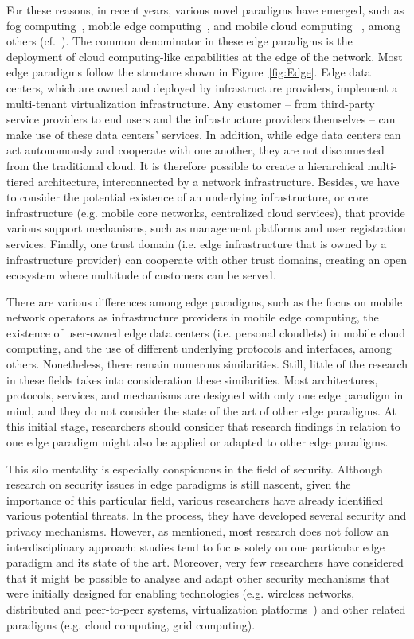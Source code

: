 \documentclass[twocolumn,preprint,3p]{elsarticle}
\begin{document}
For these reasons, in recent years, various novel paradigms have emerged, such as fog computing~\cite{Vaquero14}, mobile edge computing~\cite{Michael14}, and mobile cloud computing ~\cite{WangMCC15}, among others (cf.~\cite{Manco2015,GarciaLopez15}). The common denominator in these edge paradigms is the deployment of cloud computing-like capabilities at the edge of the network. Most edge paradigms follow the structure shown in Figure~\ref{fig:Edge}. Edge data centers, which are owned and deployed by infrastructure providers, implement a multi-tenant virtualization infrastructure. Any customer -- from third-party service providers to end users and the infrastructure providers themselves -- can make use of these data centers' services. In addition, while edge data centers can act autonomously and cooperate with one another, they are not disconnected from the traditional cloud. It is therefore possible to create a hierarchical multi-tiered architecture, interconnected by a network infrastructure. Besides, we have to consider the potential existence of an underlying infrastructure, or core infrastructure (e.g. mobile core networks, centralized cloud services), that provide various support mechanisms, such as management platforms and user registration services. Finally, one trust domain (i.e. edge infrastructure that is owned by a infrastructure provider) can cooperate with other trust domains, creating an open ecosystem where multitude of customers can be served.

There are various differences among edge paradigms, such as the focus on mobile network operators as infrastructure providers in mobile edge computing, the existence of user-owned edge data centers (i.e. personal cloudlets) in mobile cloud computing, and the use of different underlying protocols and interfaces, among others. Nonetheless, there remain numerous similarities. Still, little of the research in these fields takes into consideration these similarities. Most architectures, protocols, services, and mechanisms are designed with only one edge paradigm in mind, and they do not consider the state of the art of other edge paradigms. At this initial stage, researchers should consider that research findings in relation to one edge paradigm might also be applied or adapted to other edge paradigms.

This silo mentality is especially conspicuous in the field of security. Although research on security issues in edge paradigms is still nascent, given the importance of this particular field, various researchers have already identified various potential threats. In the process, they have developed several security and privacy mechanisms. However, as mentioned, most research does not follow an interdisciplinary approach: studies tend to focus solely on one particular edge paradigm and its state of the art. Moreover, very few researchers have considered that it might be possible to analyse and adapt other security mechanisms that were initially designed for enabling technologies (e.g. wireless networks, distributed and peer-to-peer systems, virtualization platforms~\cite{Vaquero14}) and other related paradigms (e.g. cloud computing, grid computing).
\end{document}
